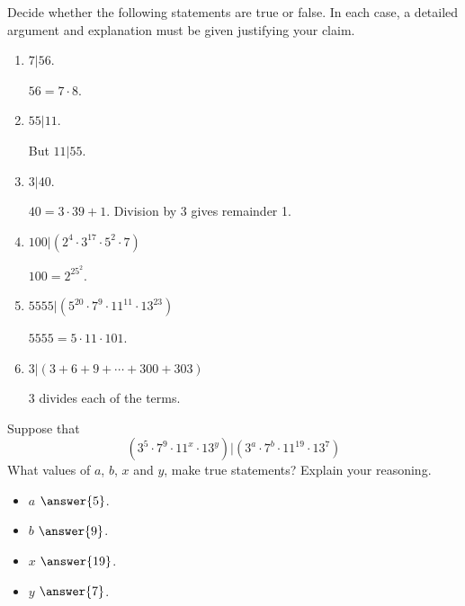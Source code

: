 \documentclass[nooutcomes]{ximera}
\begin{document}
\begin{problem}
Decide whether the following statements are true or false. In
  each case, a detailed argument and explanation must be given
  justifying your claim.
\begin{enumerate}
\item $7|56$. 
  \begin{hint}$56=7\cdot8$.\end{hint}
\item $55|11$. 
  \begin{hint}But $11|55$.\end{hint}
\item $3|40$. 
  \begin{hint}$40 = 3\cdot39 + 1$. Division by 3 gives remainder 1.\end{hint}
\item $100 | (2^4\cdot 3^{17} \cdot 5^2\cdot 7)$
  \begin{hint}$100=2^25^2$.\end{hint}
\item $5555 | (5^{20}\cdot 7^9\cdot 11^{11}\cdot 13^{23})$ 
  \begin{hint}$5555=5\cdot 11\cdot 101$. \end{hint}
\item $3| (3+ 6 + 9 + \cdots +300 + 303)$
  \begin{hint}3 divides each of the terms.\end{hint}
\end{enumerate}
\end{problem}

\begin{problem}
Suppose that 
\[
(3^5 \cdot 7^9 \cdot 11^x \cdot 13^y) | (3^a \cdot 7^b \cdot 11^{19} \cdot 13^7)
\]
What values of $a$, $b$, $x$ and $y$, make true statements? Explain
your reasoning.
\begin{itemize}
\item $a$ \wordChoice{\choice[correct]{$\ge$}\choice{$=$}\choice{$\le$}} $\answer{5}$.
\item $b$ \wordChoice{\choice[correct]{$\ge$}\choice{$=$}\choice{$\le$}} $\answer{9}$.
\item $x$ \wordChoice{\choice{$\ge$}\choice{$=$}\choice[correct]{$\le$}} $\answer{19}$.
\item $y$ \wordChoice{\choice{$\ge$}\choice{$=$}\choice[correct]{$\le$}} $\answer{7}$.
\end{itemize}
\end{problem}
\end{document}
